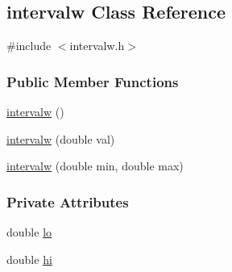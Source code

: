 \hypertarget{classintervalw}{\subsection{intervalw \-Class \-Reference}
\label{classintervalw}
}


{\ttfamily \#include $<$intervalw.\-h$>$}

\subsubsection*{\-Public \-Member \-Functions}
\begin{DoxyCompactItemize}
\item 
\hyperlink{classintervalw_a42d0d9064b9c6293b46a43df21bc1d0a}{intervalw} ()
\item 
\hyperlink{classintervalw_a7cadce6e33150ff925357cd469858468}{intervalw} (double val)
\item 
\hyperlink{classintervalw_a5df25d19ca4ff176a3e69da175820fd5}{intervalw} (double min, double max)
\end{DoxyCompactItemize}
\subsubsection*{\-Private \-Attributes}
\begin{DoxyCompactItemize}
\item 
double \hyperlink{classintervalw_ac2b69b03aba0485a6df00ae145279fbb}{lo}
\item 
double \hyperlink{classintervalw_a5f808d504e21fbfb365fc91789bfca31}{hi}
\end{DoxyCompactItemize}
